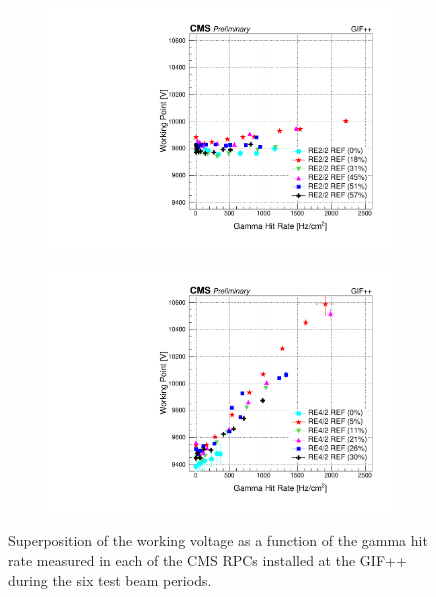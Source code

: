 \begin{figure}[H]
\begin{subfigure}{0.5\linewidth}
    		\includegraphics[width = \linewidth]{fig/chapt5/RE2-2_REF_WorkingPoint_vs_Rate.pdf}
        	\caption{\label{fig:GIFpp_wp_vs_rate:C}}
    	\end{subfigure}
    	\begin{subfigure}{0.5\linewidth}
			\centering
    		\includegraphics[width = \linewidth]{fig/chapt5/RE4-2_REF_WorkingPoint_vs_Rate.pdf}
        	\caption{\label{fig:GIFpp_wp_vs_rate:D}}
    	\end{subfigure}
		\caption{\label{fig:GIFpp_wp_vs_rate} Superposition of the working voltage as a function of the gamma hit rate measured in each of the CMS RPCs installed at the GIF++ during the six test beam periods.}
	\end{figure}
	

